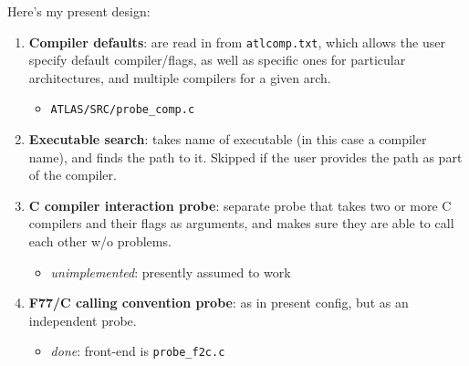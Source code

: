 \documentclass[11pt]{article}
\begin{document}


Here's my present design:
\begin{enumerate}
\item {\bf Compiler defaults}: are read in from {\tt atlcomp.txt}, which
      allows the user specify default compiler/flags, as well as specific
      ones for particular architectures, and multiple compilers for a given
      arch.  
   \begin{itemize}
      \item {\tt ATLAS/SRC/probe\_comp.c}
   \end{itemize}
\item {\bf Executable search}: takes name of executable (in this case
      a compiler name), and finds the path to it.  Skipped if the user
      provides the path as part of the compiler.
\item {\bf C compiler interaction probe}: separate probe that takes two or
      more C compilers and their flags as arguments, and makes sure they
      are able to call each other w/o problems.
   \begin{itemize}
   \item {\it unimplemented}: presently assumed to work
   \end{itemize}
\item {\bf F77/C calling convention probe}: as in present config, but as
      an independent probe.
   \begin{itemize}
   \item {\it done}: front-end is {\tt probe\_f2c.c}
   \end{itemize}
\end{enumerate}
\end{document}
